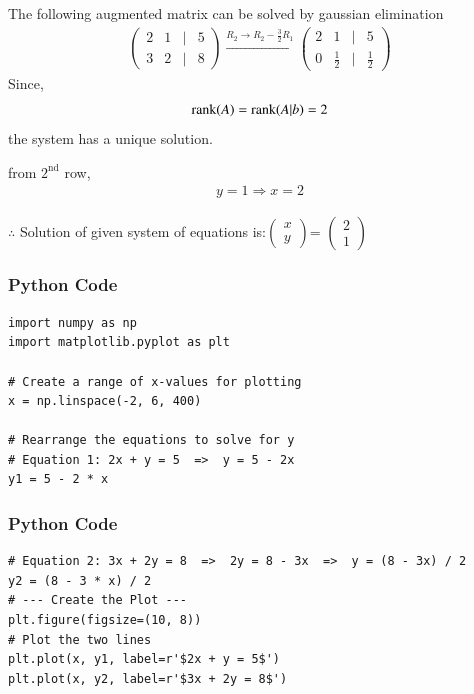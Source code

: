 \documentclass{beamer}
\begin{document}
\begin{frame}
The following augmented matrix can be solved by gaussian elimination
\begin{align}
\begin{pmatrix}2 & 1 & | & 5 \\3 & 2 & | & 8\end{pmatrix}\xrightarrow{R_2 \to R_2 - \frac{3}{2}R_1}\begin{pmatrix}2 & 1 & | & 5 \\0 & \frac{1}{2} & | & \frac{1}{2}\end{pmatrix}
\end{align}
Since,
\begin{align}
\text{rank}(A) = \text{rank}(A|b) = 2
\end{align}
the system has a unique solution.

from $2^{\text{nd}}$ row,
\begin{align}
y = 1 \Rightarrow x = 2
\end{align}

$\therefore$ Solution of given system of equations is:$\begin{pmatrix}x \\y\end{pmatrix}$= $\begin{pmatrix}2 \\1\end{pmatrix}$
\end{frame}

\begin{frame}[fragile]
\frametitle{Python Code}
\begin{lstlisting}
import numpy as np
import matplotlib.pyplot as plt

# Create a range of x-values for plotting
x = np.linspace(-2, 6, 400)

# Rearrange the equations to solve for y
# Equation 1: 2x + y = 5  =>  y = 5 - 2x
y1 = 5 - 2 * x
\end{lstlisting}
\end{frame}

\begin{frame}[fragile]
\frametitle{Python Code}
\begin{lstlisting}
# Equation 2: 3x + 2y = 8  =>  2y = 8 - 3x  =>  y = (8 - 3x) / 2
y2 = (8 - 3 * x) / 2
# --- Create the Plot ---
plt.figure(figsize=(10, 8))
# Plot the two lines
plt.plot(x, y1, label=r'$2x + y = 5$')
plt.plot(x, y2, label=r'$3x + 2y = 8$')
\end{lstlisting}
\end{frame}
\end{document}
